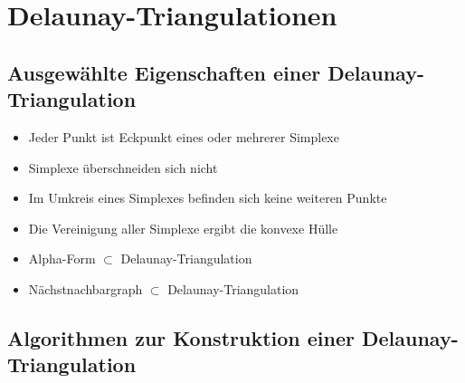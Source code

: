 \section{Delaunay-Triangulationen}
\label{appendix_delaunay}

\subsection{Ausgewählte Eigenschaften einer Delaunay-Triangulation}

\begin{itemize}
\item Jeder Punkt ist Eckpunkt eines oder mehrerer Simplexe
\item Simplexe überschneiden sich nicht
\item Im Umkreis eines Simplexes befinden sich keine weiteren Punkte
\item Die Vereinigung aller Simplexe ergibt die konvexe Hülle
\item Alpha-Form $\subset$ Delaunay-Triangulation
\item %
  Nächstnachbargraph $\subset$ Delaunay-Triangulation
\end{itemize}

\subsection{Algorithmen zur Konstruktion einer Delaunay-Triangulation}

